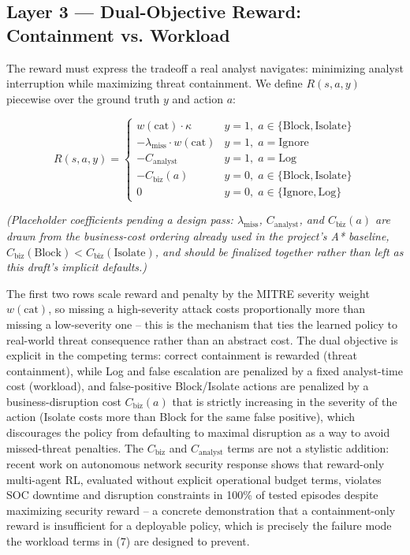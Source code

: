 \documentclass[conference]{IEEEtran}
\newcommand{\categ}{\text{cat}}
\newcommand{\conf}{\kappa}
\newcommand{\sev}{w}
\begin{document}
\subsection{Layer 3 --- Dual-Objective Reward: Containment vs. Workload}

The reward must express the tradeoff a real analyst navigates: minimizing analyst interruption while maximizing threat containment. We define $R(s,a,y)$ piecewise over the ground truth $y$ and action $a$:

\begin{equation}
R(s,a,y) =
\begin{cases}
\sev(\categ) \cdot \conf & y{=}1,\; a \in \{\text{Block},\text{Isolate}\} \\[2pt]
-\lambda_{\text{miss}} \cdot \sev(\categ) & y{=}1,\; a = \text{Ignore} \\[2pt]
-C_{\text{analyst}} & y{=}1,\; a = \text{Log} \\[2pt]
-C_{\text{biz}}(a) & y{=}0,\; a \in \{\text{Block},\text{Isolate}\} \\[2pt]
0 & y{=}0,\; a \in \{\text{Ignore},\text{Log}\}
\end{cases}
\end{equation}

\emph{(Placeholder coefficients pending a design pass: $\lambda_{\text{miss}}$, $C_{\text{analyst}}$, and $C_{\text{biz}}(a)$ are drawn from the business-cost ordering already used in the project's A* baseline, $C_{\text{biz}}(\text{Block}) < C_{\text{biz}}(\text{Isolate})$, and should be finalized together rather than left as this draft's implicit defaults.)}

The first two rows scale reward and penalty by the MITRE severity weight $\sev(\categ)$, so missing a high-severity attack costs proportionally more than missing a low-severity one -- this is the mechanism that ties the learned policy to real-world threat consequence rather than an abstract cost. The dual objective is explicit in the competing terms: correct containment is rewarded (threat containment), while Log and false escalation are penalized by a fixed analyst-time cost (workload), and false-positive Block/Isolate actions are penalized by a business-disruption cost $C_{\text{biz}}(a)$ that is strictly increasing in the severity of the action (Isolate costs more than Block for the same false positive), which discourages the policy from defaulting to maximal disruption as a way to avoid missed-threat penalties. The $C_{\text{biz}}$ and $C_{\text{analyst}}$ terms are not a stylistic addition: recent work on autonomous network security response shows that reward-only multi-agent RL, evaluated without explicit operational budget terms, violates SOC downtime and disruption constraints in 100\% of tested episodes despite maximizing security reward \cite{safetycontract2026} -- a concrete demonstration that a containment-only reward is insufficient for a deployable policy, which is precisely the failure mode the workload terms in (7) are designed to prevent.
\end{document}
